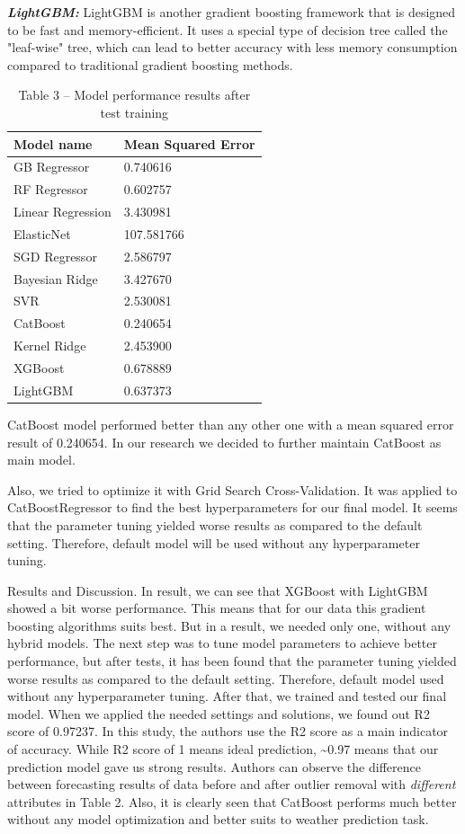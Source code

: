\begin{multicols}{2}
\emph{{\bfseries LightGBM:}} LightGBM is another gradient boosting
framework that is designed to be fast and memory-efficient. It uses a
special type of decision tree called the "leaf-wise" tree, which can
lead to better accuracy with less memory consumption compared to
traditional gradient boosting methods.

\begin{table}[H]
\caption*{Table 3 -- Model performance results after test training}
\centering
\begin{tabular}{|l|l|}
\hline
Model name & Mean Squared Error \\ \hline
GB Regressor & 0.740616 \\ \hline
RF Regressor & 0.602757 \\ \hline
Linear Regression & 3.430981 \\ \hline
ElasticNet & 107.581766 \\ \hline
SGD Regressor & 2.586797 \\ \hline
Bayesian Ridge & 3.427670 \\ \hline
SVR & 2.530081 \\ \hline
CatBoost & 0.240654 \\ \hline
Kernel Ridge & 2.453900 \\ \hline
XGBoost & 0.678889 \\ \hline
LightGBM & 0.637373 \\ \hline
\end{tabular}
\end{table}

CatBoost model performed better than any other one with a mean squared
error result of 0.240654. In our research we decided to further maintain
CatBoost as main model.

Also, we tried to optimize it with Grid Search Cross-Validation. It was
applied to CatBoostRegressor to find the best hyperparameters for our
final model. It seems that the parameter tuning yielded worse results as
compared to the default setting. Therefore, default model will be used
without any hyperparameter tuning.

Results and Discussion. In result, we can see that XGBoost with LightGBM
showed a bit worse performance. This means that for our data this
gradient boosting algorithms suits best. But in a result, we needed only
one, without any hybrid models. The next step was to tune model
parameters to achieve better performance, but after tests, it has been
found that the parameter tuning yielded worse results as compared to the
default setting. Therefore, default model used without any
hyperparameter tuning. After that, we trained and tested our final
model. When we applied the needed settings and solutions, we found out
R2 score of 0.97237. In this study, the authors use the R2 score as a
main indicator of accuracy. While R2 score of 1 means ideal prediction,
\textasciitilde0.97 means that our prediction model gave us strong
results. Authors can observe the difference between forecasting results
of data before and after outlier removal with \emph{different}
attributes in Table 2. Also, it is clearly seen that CatBoost performs
much better without any model optimization and better suits to weather
prediction task.



\end{multicols}
